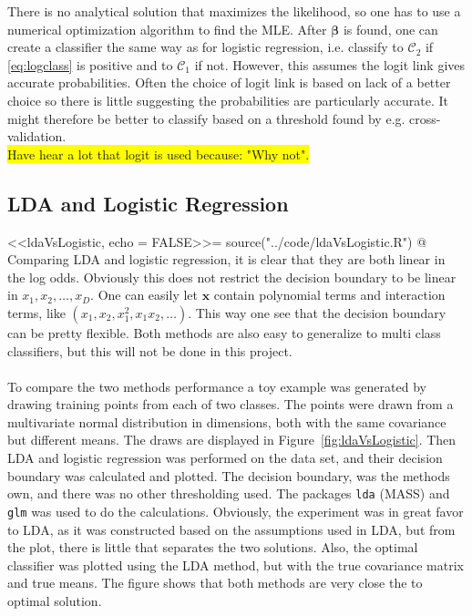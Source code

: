 There is no analytical solution that maximizes the likelihood, so one has to use a numerical optimization algorithm to find the MLE.  
After $\bm \beta$ is found, one can create a classifier the same way as for logistic regression, i.e. classify to $\mathcal{C}_2$ if \eqref{eq:logclass} is positive and to $\mathcal{C}_1$ if not. However, this assumes the logit link gives accurate probabilities. Often the choice of logit link is based on lack of a better choice so there is little suggesting the probabilities are particularly accurate. It might therefore be better to classify based on a threshold found by e.g. cross-validation. 
\\\colorbox{yellow}{Have hear a lot that logit is used because: "Why not".}
%
\subsection{LDA and Logistic Regression}
\label{sub:LDA and Logistic Regre}
<<ldaVsLogistic, echo = FALSE>>=
source("../code/ldaVsLogistic.R")
@
Comparing LDA and logistic regression, it is clear that they are both linear in the log odds. Obviously this does not restrict the decision boundary to be linear in $x_1, x_2, \ldots , x_D$. One can easily let $\mathbf{x}$ contain polynomial terms and interaction terms, like $(x_1, x_2, x_1^2, x_1 x_2, \ldots )$. This way one see that the decision boundary can be pretty flexible. Both methods are also easy to generalize to multi class classifiers, but this will not be done in this project. \\
\\
To compare the two methods performance a toy example was generated by drawing  training points from each of two classes. The points were drawn from a multivariate normal distribution in  dimensions, both with the same covariance but different means. The draws are displayed in Figure~\ref{fig:ldaVsLogistic}. Then LDA and logistic regression was performed on the data set, and their decision boundary was calculated and plotted. The decision boundary, was the methods own, and there was no other thresholding used. The packages \verb+lda+ (MASS) and \verb+glm+ was used to do the calculations. Obviously, the experiment was in great favor to LDA, as it was constructed based on the assumptions used in LDA, but from the plot, there is little that separates the two solutions. Also, the optimal classifier was plotted using the LDA method, but with the true covariance matrix and true means. The figure shows that both methods are very close the to optimal solution.

